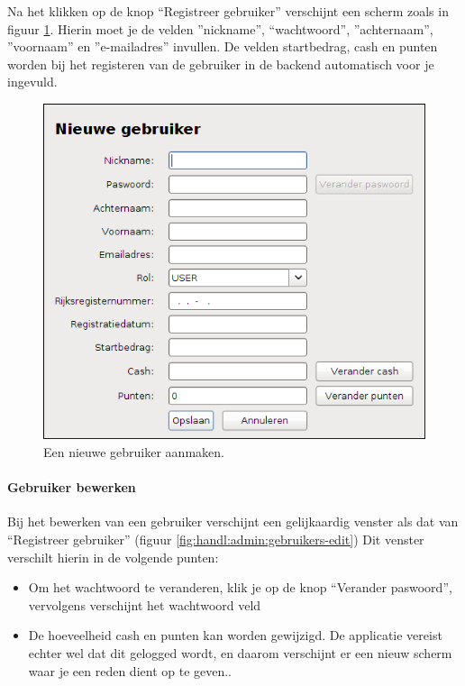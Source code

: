 Na het klikken op de knop ``Registreer gebruiker'' verschijnt een scherm zoals in figuur \ref{fig:handl:admin:gebruikers-nieuw}. Hierin moet je de velden ''nickname'', ``wachtwoord'', ''achternaam'', ''voornaam'' en ''e-mailadres'' invullen. 
De velden startbedrag, cash en punten worden bij het registeren van de gebruiker in de backend automatisch voor je ingevuld.

\begin{figure}[h!]
	\centering
		\includegraphics[scale=0.75]{images/handleiding/administratie/gebruikers-nieuw}
	\caption{Een nieuwe gebruiker aanmaken.}
		\label{fig:handl:admin:gebruikers-nieuw}
\end{figure}

\paragraph{Gebruiker bewerken}

Bij het bewerken van een gebruiker verschijnt een gelijkaardig venster als dat van ``Registreer gebruiker'' (figuur \ref{fig:handl:admin:gebruikers-edit})
Dit venster verschilt hierin in de volgende punten:

\begin{itemize}
\item{Om het wachtwoord te veranderen, klik je op de knop ``Verander paswoord'', vervolgens verschijnt het wachtwoord veld}
\item{De hoeveelheid cash en punten kan worden gewijzigd. De applicatie vereist echter wel dat dit gelogged wordt, en daarom verschijnt er een nieuw scherm waar je een reden dient op te geven..}
\end{itemize}

